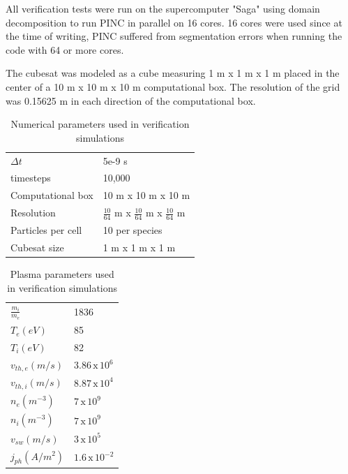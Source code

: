 All verification tests were run on the supercomputer "Saga" using domain decomposition to run PINC in parallel on 16 cores. 16 cores were used since at the time of writing, PINC suffered from segmentation errors when running the code with 64 or more cores.

The cubesat was modeled as a cube measuring 1 m x 1 m x 1 m placed in the center of a 10 m x 10 m x 10 m computational box. The resolution of the grid was 0.15625 m in each direction of the computational box.


\begin{table}[h!]
\centering
\begin{tabular}{p{5cm}p{5cm}}
\toprule
\toprule
$\Delta t$         & 5e-9 s                            \\[0.5mm]
timesteps          & 10,000                            \\[0.5mm]
Computational box  & 10 m x 10 m x 10 m                \\[0.5mm]
Resolution         & $\frac{10}{64}$ m x $\frac{10}{64}$ m x $\frac{10}{64}$ m \\[0.5mm]
Particles per cell & 10 per species                    \\[0.5mm]
Cubesat size       & 1 m x 1 m x 1 m                   \\[0.5mm]
\bottomrule
\bottomrule
\end{tabular}
\caption{Numerical parameters used in verification simulations}
\label{tab:verificationNum}
\end{table}


\begin{table}[h!]
\centering
\begin{tabular}{p{5cm}p{5cm}}
\toprule
\toprule
$\frac{m_i}{m_e}$  & 1836                       \\[1mm]
$T_e (eV)$         & 85                         \\[1mm]
$T_i (eV)$         & 82                         \\[1mm]
$v_{th,e} (m/s)$   & $3.86 \, \text{x} \, 10^6$ \\[1mm]
$v_{th,i} (m/s)$   & $8.87 \, \text{x} \, 10^4$ \\[1mm]
$n_e (m^{-3})$     & $7 \, \text{x} \, 10^9$    \\[1mm]
$n_i (m^{-3})$     & $7 \, \text{x} \, 10^9$    \\[1mm]
$v_{sw} (m/s)$     & $3 \, \text{x} \, 10^5$    \\[1mm]
$j_{ph} (A/m^2)$   & $1.6 \, \text{x} \, 10^{-2}$ \\[1mm]
\bottomrule
\bottomrule
\end{tabular}
\caption{Plasma parameters used in verification simulations}
\label{tab:verificationPla}
\end{table}


